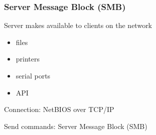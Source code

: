\begin{frame}
    \frametitle{Server Message Block (SMB) }
 Server makes available to clients on the network
  \begin{itemize}
      \item files 
      \item printers 
      \item serial ports
      \item API
  \end{itemize}  

Connection: NetBIOS over TCP/IP

Send commands: Server Message Block (SMB)


\end{frame}